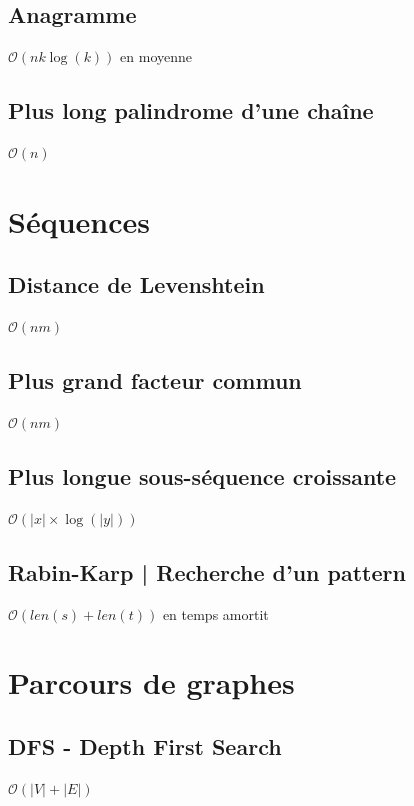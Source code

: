 \documentclass[8pt]{article}
\begin{document}
        \subsection{Anagramme}
            $\mathcal{O}(nk \log(k))$ en moyenne
            {\scriptsize}
        \subsection{Plus long palindrome d'une chaîne}
        $\mathcal{O}(n)$
        {\scriptsize}
    \section{Séquences}
        \subsection{Distance de Levenshtein}
        $\mathcal{O}(nm)$
        {\scriptsize}
        \subsection{Plus grand facteur commun}
        $\mathcal{O}(nm)$
        {\scriptsize}
        \subsection{Plus longue sous-séquence croissante}
        $\mathcal{O}(\lvert x \rvert \times \log(\lvert y \rvert))$
        {\scriptsize}
        \subsection{Rabin-Karp | Recherche d'un pattern}
        $\mathcal{O}(len(s) + len(t))$ en temps amortit
        {\scriptsize}
    \section{Parcours de graphes}
        \subsection{DFS - Depth First Search}
        $\mathcal{O}(\lvert V \rvert  + \lvert E \rvert)$
        {\scriptsize}
\end{document}
